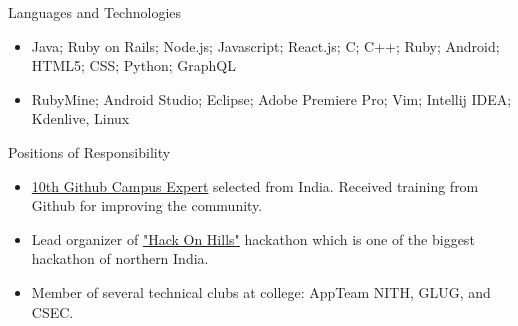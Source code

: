 \documentclass[]{mcdowellcv}
\begin{document}
	\begin{cvsection}{Languages and Technologies}
		\begin{cvsubsection}{}{}{}	
			\begin{itemize}
				\item Java; Ruby on Rails; Node.js; Javascript; React.js; C; C++; Ruby; Android; HTML5; CSS; Python; GraphQL
				\item RubyMine; Android Studio; Eclipse; Adobe Premiere Pro; Vim; Intellij IDEA; Kdenlive, Linux
			\end{itemize}
		\end{cvsubsection}
	\end{cvsection}
	
	\begin{cvsection}{Positions of Responsibility}
		\begin{cvsubsection}{}{}{}	
			\begin{itemize}
				\item {\href {https://githubcampus.expert/sukhbir-singh/}{10th Github Campus Expert}} selected from India. Received training from Github for improving the community.
				\item Lead organizer of {\href {http://hackonhills.com/}{"Hack On Hills"}} hackathon which is one of the biggest hackathon of northern India.
				\item Member of several technical clubs at college: AppTeam NITH, GLUG, and CSEC.				
			\end{itemize}
		\end{cvsubsection}
	\end{cvsection}
	
\end{document}
